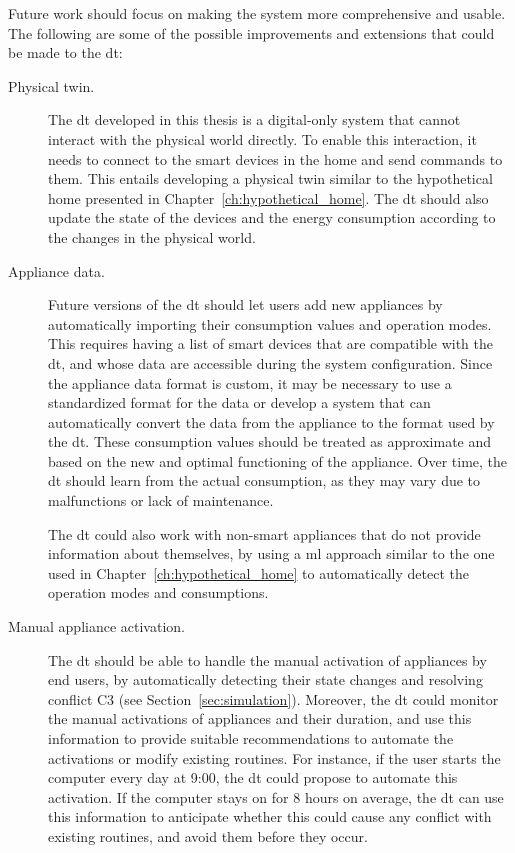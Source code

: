 Future work should focus on making the system more comprehensive and usable. The following are some of the possible improvements and extensions that could be made to the \acrshort{dt}:
\begin{description}
    \item[Physical twin.] The \acrshort{dt} developed in this thesis is a digital-only system that cannot interact with the physical world directly. To enable this interaction, it needs to connect to the smart devices in the home and send commands to them. This entails developing a physical twin similar to the hypothetical home presented in Chapter~\ref{ch:hypothetical_home}. The \acrshort{dt} should also update the state of the devices and the energy consumption according to the changes in the physical world.

    \item[Appliance data.] Future versions of the \acrshort{dt} should let users add new appliances by automatically importing their consumption values and operation modes. This requires having a list of smart devices that are compatible with the \acrshort{dt}, and whose data are accessible during the system configuration. Since the appliance data format is custom, it may be necessary to use a standardized format for the data or develop a system that can automatically convert the data from the appliance to the format used by the \acrshort{dt}. These consumption values should be treated as approximate and based on the new and optimal functioning of the appliance. Over time, the \acrshort{dt} should learn from the actual consumption, as they may vary due to malfunctions or lack of maintenance.

    The \acrshort{dt} could also work with non-smart appliances that do not provide information about themselves, by using a \acrshort{ml} approach similar to the one used in Chapter~\ref{ch:hypothetical_home} to automatically detect the operation modes and consumptions.

    \item[Manual appliance activation.] The \acrshort{dt} should be able to handle the manual activation of appliances by end users, by automatically detecting their state changes and resolving conflict C3 (see Section~\ref{sec:simulation}). Moreover, the \acrshort{dt} could monitor the manual activations of appliances and their duration, and use this information to provide suitable recommendations to automate the activations or modify existing routines. For instance, if the user starts the computer every day at 9:00, the \acrshort{dt} could propose to automate this activation. If the computer stays on for 8 hours on average, the \acrshort{dt} can use this information to anticipate whether this could cause any conflict with existing routines, and avoid them before they occur.


\end{description}

